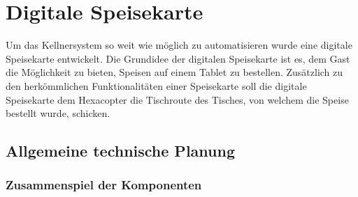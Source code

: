 \chapter{Digitale Speisekarte}
\renewcommand{\kapitelautor}{Autor: Katharina Joksch}
Um das Kellnersystem so weit wie möglich zu automatisieren wurde eine digitale Speisekarte entwickelt. 
Die Grundidee der digitalen Speisekarte ist es, dem Gast die Möglichkeit zu bieten, Speisen auf einem Tablet zu bestellen.
Zusätzlich zu den herkömmlichen Funktionalitäten einer Speisekarte soll die digitale Speisekarte dem Hexacopter die Tischroute des Tisches, von welchem die Speise bestellt wurde, schicken. 

\section{Allgemeine technische Planung}

  \subsection{Zusammenspiel der Komponenten}

